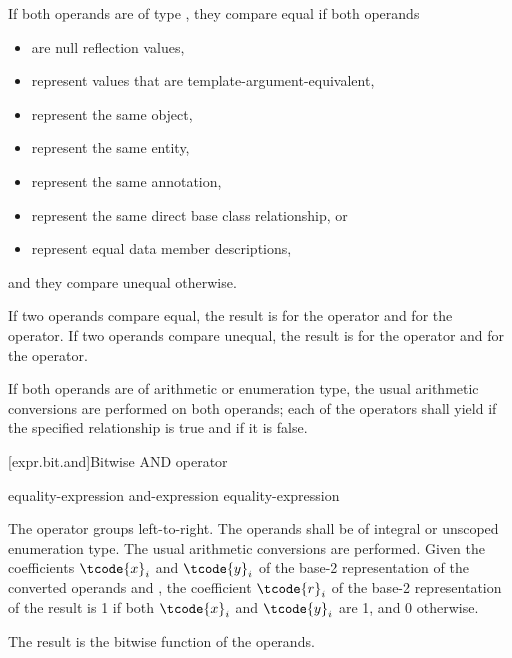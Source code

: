 \pnum
If both operands are of type ,
they compare equal if both operands
\begin{itemize}
\item are null reflection values,
\item represent values that are template-argument-equivalent,
\item represent the same object,
\item represent the same entity,
\item represent the same annotation,
\item represent the same direct base class relationship, or
\item represent equal data member descriptions,
\end{itemize}
and they compare unequal otherwise.

\pnum
If two operands compare equal, the result is  for
the \tcode{==} operator and  for the \tcode{!=} operator. If two operands
compare unequal, the result is  for the \tcode{==} operator and
 for the \tcode{!=} operator.

\pnum
If both operands are of arithmetic or enumeration type, the usual arithmetic
conversions are performed on both operands; each of the operators shall yield
 if the specified relationship is true and  if it is
false.

[expr.bit.and]{Bitwise AND operator}%
%
%
%
%

\begin{bnf}
\br
    equality-expression\br
    and-expression \terminal{\&} equality-expression
\end{bnf}

\pnum
The \tcode{\&} operator groups left-to-right.
The operands shall be of integral or unscoped enumeration type.
The usual arithmetic conversions are performed.
Given the coefficients $\tcode{x}_i$ and $\tcode{y}_i$
of the base-2 representation
of the converted operands  and ,
the coefficient $\tcode{r}_i$
of the base-2 representation of the result 
is 1 if both $\tcode{x}_i$ and $\tcode{y}_i$ are 1, and 0 otherwise.
\begin{note}
The result is the bitwise  function of the operands.
\end{note}

